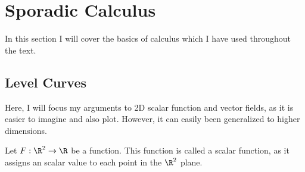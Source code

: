 \section{Sporadic Calculus}

In this section I will cover the basics of calculus which I have used throughout the text. 

\subsection{Level Curves}
Here, I will focus my arguments to 2D scalar function and vector fields, as it is easier to imagine and also plot. However, it can easily been generalized to higher dimensions. 

Let $F: \R^2 \to \R$ be a function. This function is called a scalar function, as it assigns an scalar value to each point in the $\R^2$ plane. 
